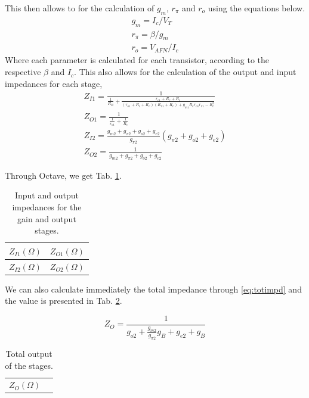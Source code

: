 This then allows to for the calculation of $g_m$, $r_\pi$ and $r_o$ using the equations below.
\begin{gather}
    g_m = I_c/V_T\\
    r_\pi = \beta/g_m\\
    r_o = V_{AFN}/I_c
\end{gather}
Where each parameter is calculated for each transistor, according to the respective $\beta$ and $I_c$.
This also allows for the calculation of the output and input impedances for each stage,
\begin{gather}
    Z_{I1} = \frac{1}{\frac{1}{R_B}+\frac{r_{o1}+R_c+R_e}{(r_{o1}+R_c+R_e)(R_{\pi 1}+R_e)+g_{m1}R_er_{o1}r_{\pi 1} - R_e^2}} \\
    Z_{O1} = \frac{1}{\frac{1}{r_{o1}}+\frac{1}{R_c}}\\
    Z_{I2} = \frac{g_{m2} + g_{\pi 2} + g_{o2} + g_{e2}}{g_{\pi 2}}(g_{\pi 2} + g_{o2} + g_{e2})\\
    Z_{O2} = \frac{1}{g_{m2} + g_{\pi 2} + g_{o2} + g_{e2}}
\end{gather}

Through Octave, we get Tab.  \ref{tab:my_label}.

\begin{table}[H]
    \centering
    \begin{tabular}{c|c}
    \hline
    $Z_{I1} (\Omega)$ & $Z_{O1}(\Omega)$\\
    \hline
    
    \hline
    $Z_{I2} (\Omega)$ & $Z_{O2}(\Omega)$\\
    \hline
    
    \hline
    \end{tabular}
    \caption{Input and output impedances for the gain and output stages.}
    \label{tab:my_label}
\end{table}

We can also calculate immediately the total impedance through \eqref{eq:totimpd} and the value is presented in Tab. \ref{tab:totimpd}.

\begin{equation}
    Z_O = \frac{1}{g_{o2} + \frac{g_{m2}}{g_{\pi 2}}g_B + g_{e2} + g_B}
    \label{eq:totimpd}
\end{equation}

\begin{table}[H]
    \centering
    \begin{tabular}{c|c}
    \hline
    $Z_{O} (\Omega)$ & 
    
    \hline
    \end{tabular}
    \caption{Total output of the stages.}
    \label{tab:totimpd}
\end{table}

